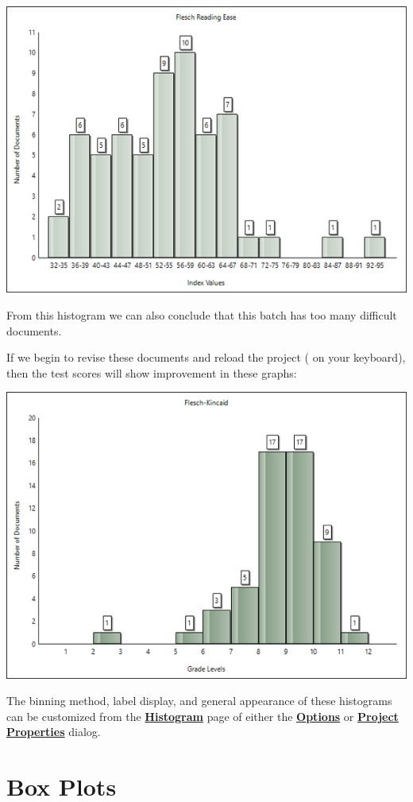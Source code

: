 \documentclass[
]{book}
\theoremstyle{definition}
\theoremstyle{definition}
\theoremstyle{definition}
\theoremstyle{definition}
\theoremstyle{remark}
\begin{document}
\begin{center}\includegraphics[width=0.75\linewidth,]{Images/histoindex} \end{center}

From this histogram we can also conclude that this batch has too many difficult documents.

If we begin to revise these documents and reload the project ( on your keyboard), then the test scores will show improvement in these graphs:

\begin{center}\includegraphics[width=0.75\linewidth,]{Images/histoimproved} \end{center}

The binning method, label display, and general appearance of these histograms can be customized from the \protect\hyperlink{options-histograms}{\textbf{Histogram}} page of either the \protect\hyperlink{options-overview}{\textbf{Options}} or \protect\hyperlink{options-overview}{\textbf{Project Properties}} dialog.

\hypertarget{reviewing-batch-box-plots}{%
\section{Box Plots}\label{reviewing-batch-box-plots}}
\end{document}
